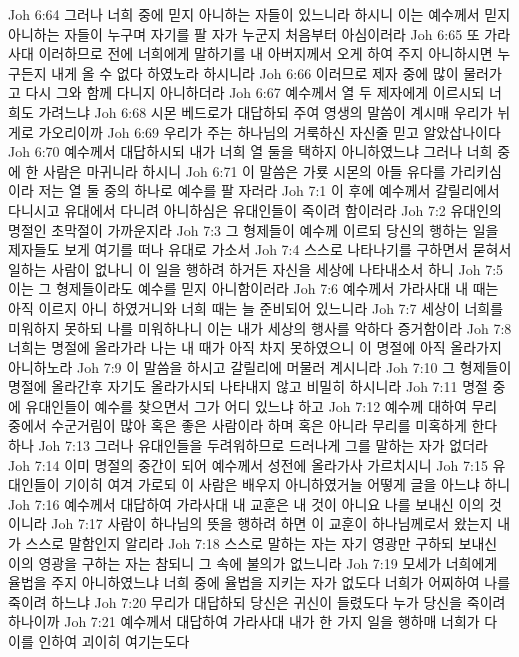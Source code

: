 Joh 6:64  그러나 너희 중에 믿지 아니하는 자들이 있느니라 하시니 이는 예수께서 믿지 아니하는 자들이 누구며 자기를 팔 자가 누군지 처음부터 아심이러라
Joh 6:65  또 가라사대 이러하므로 전에 너희에게 말하기를 내 아버지께서 오게 하여 주지 아니하시면 누구든지 내게 올 수 없다 하였노라 하시니라
Joh 6:66  이러므로 제자 중에 많이 물러가고 다시 그와 함께 다니지 아니하더라
Joh 6:67  예수께서 열 두 제자에게 이르시되 너희도 가려느냐
Joh 6:68  시몬 베드로가 대답하되 주여 영생의 말씀이 계시매 우리가 뉘게로 가오리이까
Joh 6:69  우리가 주는 하나님의 거룩하신 자신줄 믿고 알았삽나이다
Joh 6:70  예수께서 대답하시되 내가 너희 열 둘을 택하지 아니하였느냐 그러나 너희 중에 한 사람은 마귀니라 하시니
Joh 6:71  이 말씀은 가룟 시몬의 아들 유다를 가리키심이라 저는 열 둘 중의 하나로 예수를 팔 자러라
Joh 7:1  이 후에 예수께서 갈릴리에서 다니시고 유대에서 다니려 아니하심은 유대인들이 죽이려 함이러라
Joh 7:2  유대인의 명절인 초막절이 가까운지라
Joh 7:3  그 형제들이 예수께 이르되 당신의 행하는 일을 제자들도 보게 여기를 떠나 유대로 가소서
Joh 7:4  스스로 나타나기를 구하면서 묻혀서 일하는 사람이 없나니 이 일을 행하려 하거든 자신을 세상에 나타내소서 하니
Joh 7:5  이는 그 형제들이라도 예수를 믿지 아니함이러라
Joh 7:6  예수께서 가라사대 내 때는 아직 이르지 아니 하였거니와 너희 때는 늘 준비되어 있느니라
Joh 7:7  세상이 너희를 미워하지 못하되 나를 미워하나니 이는 내가 세상의 행사를 악하다 증거함이라
Joh 7:8  너희는 명절에 올라가라 나는 내 때가 아직 차지 못하였으니 이 명절에 아직 올라가지 아니하노라
Joh 7:9  이 말씀을 하시고 갈릴리에 머물러 계시니라
Joh 7:10  그 형제들이 명절에 올라간후 자기도 올라가시되 나타내지 않고 비밀히 하시니라
Joh 7:11  명절 중에 유대인들이 예수를 찾으면서 그가 어디 있느냐 하고
Joh 7:12  예수께 대하여 무리 중에서 수군거림이 많아 혹은 좋은 사람이라 하며 혹은 아니라 무리를 미혹하게 한다 하나
Joh 7:13  그러나 유대인들을 두려워하므로 드러나게 그를 말하는 자가 없더라
Joh 7:14  이미 명절의 중간이 되어 예수께서 성전에 올라가사 가르치시니
Joh 7:15  유대인들이 기이히 여겨 가로되 이 사람은 배우지 아니하였거늘 어떻게 글을 아느냐 하니
Joh 7:16  예수께서 대답하여 가라사대 내 교훈은 내 것이 아니요 나를 보내신 이의 것이니라
Joh 7:17  사람이 하나님의 뜻을 행하려 하면 이 교훈이 하나님께로서 왔는지 내가 스스로 말함인지 알리라
Joh 7:18  스스로 말하는 자는 자기 영광만 구하되 보내신 이의 영광을 구하는 자는 참되니 그 속에 불의가 없느니라
Joh 7:19  모세가 너희에게 율법을 주지 아니하였느냐 너희 중에 율법을 지키는 자가 없도다 너희가 어찌하여 나를 죽이려 하느냐
Joh 7:20  무리가 대답하되 당신은 귀신이 들렸도다 누가 당신을 죽이려 하나이까
Joh 7:21  예수께서 대답하여 가라사대 내가 한 가지 일을 행하매 너희가 다 이를 인하여 괴이히 여기는도다
